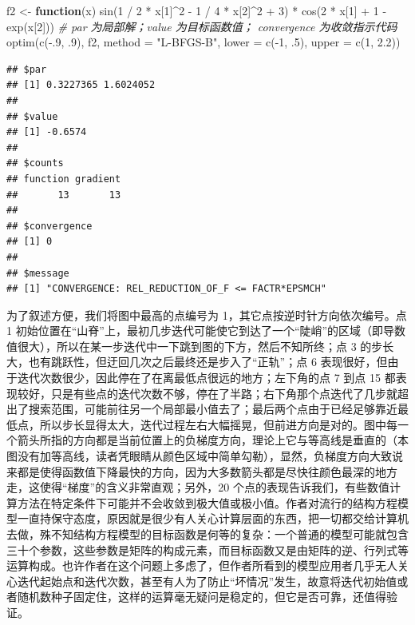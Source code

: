 \documentclass[
  b5paper,
  UTF8,twoside]{book}
\newenvironment{Shaded}{\begin{snugshade}}{\end{snugshade}}
\newcommand{\AttributeTok}[1]{\textcolor[rgb]{0.77,0.63,0.00}{#1}}
\newcommand{\CommentTok}[1]{\textcolor[rgb]{0.56,0.35,0.01}{\textit{#1}}}
\newcommand{\ControlFlowTok}[1]{\textcolor[rgb]{0.13,0.29,0.53}{\textbf{#1}}}
\newcommand{\DecValTok}[1]{\textcolor[rgb]{0.00,0.00,0.81}{#1}}
\newcommand{\FloatTok}[1]{\textcolor[rgb]{0.00,0.00,0.81}{#1}}
\newcommand{\FunctionTok}[1]{\textcolor[rgb]{0.00,0.00,0.00}{#1}}
\newcommand{\NormalTok}[1]{#1}
\newcommand{\OtherTok}[1]{\textcolor[rgb]{0.56,0.35,0.01}{#1}}
\newcommand{\SpecialCharTok}[1]{\textcolor[rgb]{0.00,0.00,0.00}{#1}}
\newcommand{\StringTok}[1]{\textcolor[rgb]{0.31,0.60,0.02}{#1}}
\begin{document}
\begin{Shaded}
\begin{Highlighting}[]
\NormalTok{f2 }\OtherTok{\textless{}{-}} \ControlFlowTok{function}\NormalTok{(x) }\FunctionTok{sin}\NormalTok{(}\DecValTok{1} \SpecialCharTok{/} \DecValTok{2} \SpecialCharTok{*}\NormalTok{ x[}\DecValTok{1}\NormalTok{]}\SpecialCharTok{\^{}}\DecValTok{2} \SpecialCharTok{{-}} \DecValTok{1} \SpecialCharTok{/} \DecValTok{4} \SpecialCharTok{*}\NormalTok{ x[}\DecValTok{2}\NormalTok{]}\SpecialCharTok{\^{}}\DecValTok{2} \SpecialCharTok{+} \DecValTok{3}\NormalTok{) }\SpecialCharTok{*}
    \FunctionTok{cos}\NormalTok{(}\DecValTok{2} \SpecialCharTok{*}\NormalTok{ x[}\DecValTok{1}\NormalTok{] }\SpecialCharTok{+} \DecValTok{1} \SpecialCharTok{{-}} \FunctionTok{exp}\NormalTok{(x[}\DecValTok{2}\NormalTok{]))}
\CommentTok{\# par 为局部解；value 为目标函数值； convergence 为收敛指示代码}
\FunctionTok{optim}\NormalTok{(}\FunctionTok{c}\NormalTok{(}\SpecialCharTok{{-}}\NormalTok{.}\DecValTok{9}\NormalTok{, .}\DecValTok{9}\NormalTok{), f2, }\AttributeTok{method =} \StringTok{"L{-}BFGS{-}B"}\NormalTok{, }\AttributeTok{lower =} \FunctionTok{c}\NormalTok{(}\SpecialCharTok{{-}}\DecValTok{1}\NormalTok{, .}\DecValTok{5}\NormalTok{), }\AttributeTok{upper =} \FunctionTok{c}\NormalTok{(}\DecValTok{1}\NormalTok{, }\FloatTok{2.2}\NormalTok{))}
\end{Highlighting}
\end{Shaded}

\begin{verbatim}
## $par
## [1] 0.3227365 1.6024052
## 
## $value
## [1] -0.6574
## 
## $counts
## function gradient 
##       13       13 
## 
## $convergence
## [1] 0
## 
## $message
## [1] "CONVERGENCE: REL_REDUCTION_OF_F <= FACTR*EPSMCH"
\end{verbatim}

为了叙述方便，我们将图中最高的点编号为 1，其它点按逆时针方向依次编号。点 1 初始位置在``山脊''上，最初几步迭代可能使它到达了一个``陡峭''的区域（即导数值很大），所以在某一步迭代中一下跳到图的下方，然后不知所终；点 3 的步长大，也有跳跃性，但迂回几次之后最终还是步入了``正轨''；点 6 表现很好，但由于迭代次数很少，因此停在了在离最低点很远的地方；左下角的点 7 到点 15 都表现较好，只是有些点的迭代次数不够，停在了半路；右下角那个点迭代了几步就超出了搜索范围，可能前往另一个局部最小值去了；最后两个点由于已经足够靠近最低点，所以步长显得太大，迭代过程左右大幅摇晃，但前进方向是对的。图中每一个箭头所指的方向都是当前位置上的负梯度方向，理论上它与等高线是垂直的（本图没有加等高线，读者凭眼睛从颜色区域中简单勾勒），显然，负梯度方向大致说来都是使得函数值下降最快的方向，因为大多数箭头都是尽快往颜色最深的地方走，这使得``梯度''的含义非常直观；另外，20 个点的表现告诉我们，有些数值计算方法在特定条件下可能并不会收敛到极大值或极小值。作者对流行的结构方程模型一直持保守态度，原因就是很少有人关心计算层面的东西，把一切都交给计算机去做，殊不知结构方程模型的目标函数是何等的复杂：一个普通的模型可能就包含三十个参数，这些参数是矩阵的构成元素，而目标函数又是由矩阵的逆、行列式等运算构成。也许作者在这个问题上多虑了，但作者所看到的模型应用者几乎无人关心迭代起始点和迭代次数，甚至有人为了防止``坏情况''发生，故意将迭代初始值或者随机数种子固定住，这样的运算毫无疑问是稳定的，但它是否可靠，还值得验证。
\end{document}

